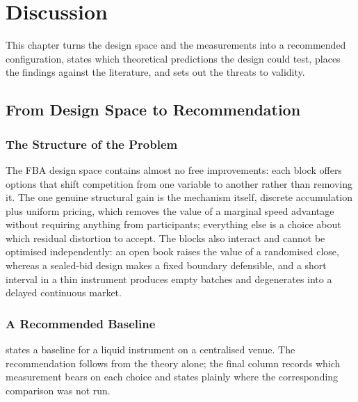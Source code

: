 \chapter{Discussion}
\label{ch:discussion}

This chapter turns the design space and the measurements into a
recommended configuration, states which theoretical predictions the design
could test, places the findings against the literature, and sets out the
threats to validity.

\section{From Design Space to Recommendation}
\label{sec:synthesis}

\subsection{The Structure of the Problem}

The FBA design space contains almost no free improvements: each block
offers options that shift competition from one variable to another rather
than removing it. The one genuine structural gain is the mechanism itself,
discrete accumulation plus uniform pricing, which removes the value of a
marginal speed advantage without requiring anything from participants;
everything else is a choice about which residual distortion to accept. The
blocks also interact and cannot be optimised independently: an open book
raises the value of a randomised close, whereas a sealed-bid design makes a
fixed boundary defensible, and a short interval in a thin instrument
produces empty batches and degenerates into a delayed continuous market.

\subsection{A Recommended Baseline}

 states a baseline for a liquid instrument on a
centralised venue. The recommendation follows from the theory alone; the
final column records which measurement bears on each choice and states
plainly where the corresponding comparison was not run.


